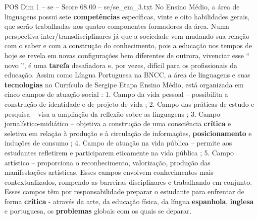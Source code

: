 \begin{textsample}{POS Dim 1 – se – Score 68.00 – se/se\_em\_3.txt}
No Ensino Médio, a área de linguagens possui sete \textbf{competências} específicas, vinte e oito habilidades gerais, que serão trabalhadas nos quatro componentes formadores da área.
Numa perspectiva inter/transdisciplinares já que a sociedade vem mudando sua relação com o saber e com a construção do conhecimento, pois a educação nos tempos de hoje se revela em novas configurações bem diferentes de outrora, vivenciar esse “ novo ”, é uma \textbf{tarefa} desafiadora e, por vezes, difícil para os profissionais da educação.
Assim como Língua Portuguesa na BNCC, a área de linguagens e suas \textbf{tecnologias} no Currículo de Sergipe Etapa Ensino Médio, está organizada em cinco campos de atuação social : 1.
Campo da vida pessoal – possibilita a construção de identidade e de projeto de vida ; 2.
Campo das práticas de estudo e pesquisa – visa a ampliação da reflexão sobre as linguagens ; 3.
Campo jornalístico-midiático – objetiva a construção de uma consciência \textbf{crítica} e seletiva em relação à produção e à circulação de informações, \textbf{posicionamento} e induções de consumo ; 4.
Campo de atuação na vida pública – permite aos estudantes refletirem e participarem eticamente na vida pública ; 5.
Campo artístico – proporciona o reconhecimento, valorização, produção das manifestações artísticas.
Esses campos envolvem conhecimentos mais contextualizados, rompendo as barreiras disciplinares e trabalhando em conjunto.
Esses campos têm por responsabilidade preparar o estudante para enfrentar de forma \textbf{crítica} - através da arte, da educação física, da língua \textbf{espanhola}, \textbf{inglesa} e portuguesa, os \textbf{problemas} globais com os quais se deparar.

\end{textsample}
